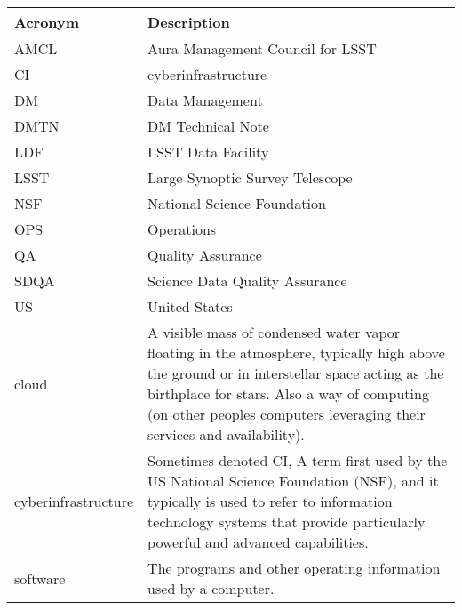 \addtocounter{table}{-1}
\begin{longtable}{|l|p{}|}\hline
\textbf{Acronym} & \textbf{Description}  \\\hline

AMCL & Aura Management Council for LSST \\\hline
CI & \gls{cyberinfrastructure} \\\hline
DM & Data Management \\\hline
DMTN & DM Technical Note \\\hline
LDF & LSST Data Facility \\\hline
LSST & Large Synoptic Survey Telescope \\\hline
NSF & National Science Foundation \\\hline
OPS & Operations \\\hline
QA & Quality Assurance \\\hline
SDQA & Science Data Quality Assurance \\\hline
US & United States \\\hline
cloud & A visible mass of condensed water vapor floating in the atmosphere, typically high above the ground or in interstellar space acting as the birthplace for stars.  Also a way of computing (on other peoples computers leveraging their services and availability). \\\hline
cyberinfrastructure & Sometimes denoted CI, A term first used by the US National Science Foundation (\gls{NSF}), and it typically is used to refer to information technology systems that provide particularly powerful and advanced capabilities. \\\hline
software & The programs and other operating information used by a computer. \\\hline
\end{longtable}
